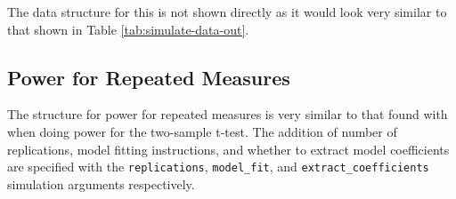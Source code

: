 \documentclass[man,mask,floatsintext]{apa6}
\begin{document}
The data structure for this is not shown directly as it would look very similar to that shown in Table \ref{tab:simulate-data-out}.

\hypertarget{power-for-repeated-measures}{%
\subsection{Power for Repeated Measures}\label{power-for-repeated-measures}}

The structure for power for repeated measures is very similar to that found with when doing power for the two-sample t-test. The addition of number of replications, model fitting instructions, and whether to extract model coefficients are specified with the \texttt{replications}, \texttt{model\_fit}, and \texttt{extract\_coefficients} simulation arguments respectively.
\end{document}
